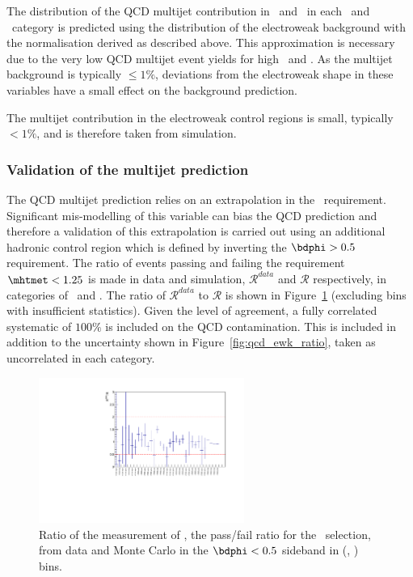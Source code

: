 The distribution of the QCD multijet contribution in \nb~and \mht~in each \scalht~and \njet~category
is predicted using the distribution of the electroweak background with the normalisation
derived as described above. This approximation is necessary due to the very low QCD multijet
event yields for high \nb~and \mht. As the multijet background is typically $\le 1\%$, 
deviations from the electroweak shape in these variables have a small effect on the background prediction.

The multijet contribution in the electroweak control regions is small, typically $<1\%$, and is 
therefore taken from simulation.

\subsubsection{Validation of the multijet prediction}

The QCD multijet prediction relies on an extrapolation in the \mhtmet~requirement.
Significant mis-modelling of this variable can bias the QCD prediction and therefore a validation
of this extrapolation is carried out using an additional hadronic control 
region which is defined by inverting the $\bdphi > 0.5$ requirement. The ratio of events passing and failing 
the requirement $\mhtmet < 1.25$ is made in data and simulation, $\mathcal{R}^{data}$ and $\mathcal{R}$ respectively,
in categories of \njet~and \scalht. The ratio of $\mathcal{R}^{data}$ to $\mathcal{R}$ is shown in
Figure~\ref{fig:RR_qcd} (excluding bins with insufficient statistics). 
Given the level of agreement, a fully correlated systematic of $100\%$ is included on
the QCD contamination. This is included in addition to the uncertainty shown in 
Figure~\ref{fig:qcd_ewk_ratio}, taken as uncorrelated in each category.

\begin{figure}[h!]
  \begin{center}        
    \includegraphics[width=0.6\textwidth]{figures/qcd/plots/doubleQcdSbSrRatio1D}
    \caption{ Ratio of the measurement of \rmhtmet, the pass/fail ratio for the \mhtmet~selection, from data and Monte Carlo in the $\bdphi < 0.5$ sideband in (\scalht, \njet) bins.  
    }
    \label{fig:RR_qcd}
  \end{center} 
\end{figure}

